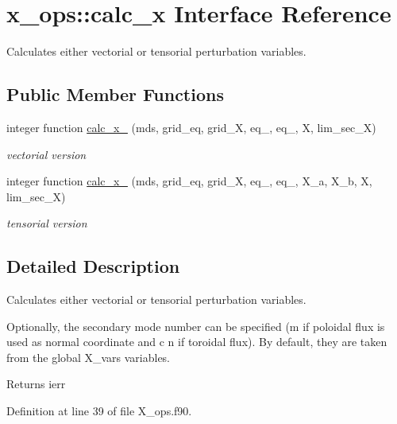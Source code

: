 \hypertarget{interfacex__ops_1_1calc__x}{}\section{x\+\_\+ops\+:\+:calc\+\_\+x Interface Reference}
\label{interfacex__ops_1_1calc__x}


Calculates either vectorial or tensorial perturbation variables.  


\subsection*{Public Member Functions}
\begin{DoxyCompactItemize}
\item 
integer function \hyperlink{interfacex__ops_1_1calc__x_a837126ca92e7f4d6821261c835b987d4}{calc\+\_\+x\+\_} (mds, grid\+\_\+eq, grid\+\_\+X, eq\+\_, eq\+\_, X, lim\+\_\+sec\+\_\+X)
\begin{DoxyCompactList}\small\item\em vectorial version \end{DoxyCompactList}\item 
integer function \hyperlink{interfacex__ops_1_1calc__x_a59ee84bcbeb93d7d7fbace7f412138f0}{calc\+\_\+x\+\_} (mds, grid\+\_\+eq, grid\+\_\+X, eq\+\_, eq\+\_, X\+\_\+a, X\+\_\+b, X, lim\+\_\+sec\+\_\+X)
\begin{DoxyCompactList}\small\item\em tensorial version \end{DoxyCompactList}\end{DoxyCompactItemize}


\subsection{Detailed Description}
Calculates either vectorial or tensorial perturbation variables. 

Optionally, the secondary mode number can be specified ({\ttfamily m} if poloidal flux is used as normal coordinate and c n if toroidal flux). By default, they are taken from the global {\ttfamily X\+\_\+vars} variables.

\begin{DoxyReturn}{Returns}
ierr 
\end{DoxyReturn}


Definition at line 39 of file X\+\_\+ops.\+f90.



